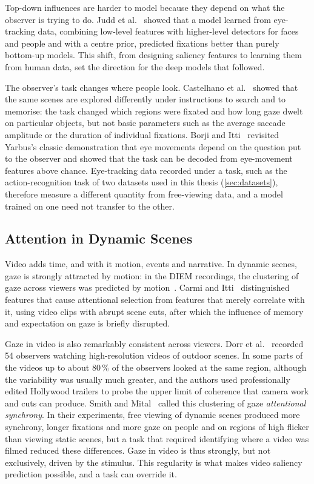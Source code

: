 Top-down influences are harder to model because they depend on what the
observer is trying to do. Judd et al.~\cite{judd2009learning} showed that a
model learned from eye-tracking data, combining low-level features with
higher-level detectors for faces and people and with a centre prior, predicted
fixations better than purely bottom-up models. This shift, from
designing saliency features to learning them from human data, set the
direction for the deep models that followed.

The observer's task changes where people look. Castelhano et
al.~\cite{castelhano2009viewing} showed that the same scenes are explored
differently under instructions to search and to memorise: the task changed which
regions were fixated and how long gaze dwelt on particular objects, but not basic
parameters such as the average saccade amplitude or the duration of individual
fixations. Borji and Itti~\cite{borji2014defending} revisited Yarbus's classic
demonstration that eye movements depend on the question put to the observer and
showed that the task can be decoded from eye-movement features above chance.
Eye-tracking data recorded under a task, such as the action-recognition task of
two datasets used in this thesis (\cref{sec:datasets}), therefore measure a
different quantity from free-viewing data, and a model trained on one need not
transfer to the other.

\subsection{Attention in Dynamic Scenes}

Video adds time, and with it motion, events and narrative. In dynamic scenes,
gaze is strongly attracted by motion: in the DIEM recordings, the clustering of
gaze across viewers was predicted by motion~\cite{mital2011clustering}. Carmi and
Itti~\cite{carmi2006visual} distinguished features that cause attentional
selection from features that merely correlate with it, using video clips with
abrupt scene cuts, after which the influence of memory and expectation on gaze
is briefly disrupted.

Gaze in video is also remarkably consistent across viewers. Dorr et
al.~\cite{dorr2010variability} recorded 54 observers watching high-resolution
videos of outdoor scenes. In some parts of the videos up to about 80\,\% of the
observers looked at the same region, although the variability was usually much
greater, and the authors used professionally edited Hollywood trailers to probe
the upper limit of coherence that camera work and cuts can produce. Smith and
Mital~\cite{smith2013attentional} called this clustering of gaze \emph{attentional
synchrony}. In their experiments, free viewing of dynamic scenes produced more
synchrony, longer fixations and more gaze on people and on regions of high
flicker than viewing static scenes, but a task that required identifying where
a video was filmed reduced these differences. Gaze in video is thus strongly, but
not exclusively, driven by the stimulus. This regularity is what makes video
saliency prediction possible, and a task can override it.

